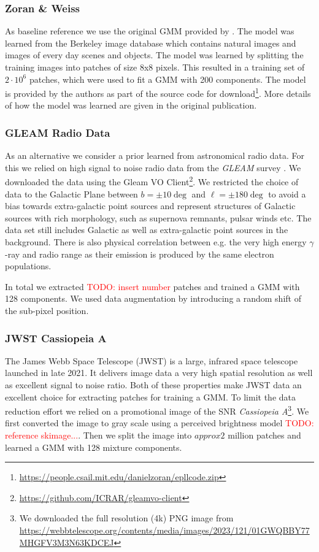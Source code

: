 \documentclass[twocolumn]{aastex631}
\newcommand{\gammaray}{$\gamma$-ray\xspace}
\newcommand{\todo}[1]{\textcolor{red}{TODO: #1}\PackageWarning{TODO:}{#1!}}
\begin{document}
    \subsubsection{Zoran \& Weiss}
    As baseline reference we use the original GMM provided by \cite{Zoran2011}. The model was learned from the Berkeley image database \citep{Martin2001} which contains natural images and images of every day scenes and objects. The model was learned by splitting the training images into patches of size 8x8 pixels. This resulted in a training set of $2 \cdot 10^{6}$ patches, which were used to fit a GMM with 200 components. The model is provided by the authors as part of the source code for download\footnote{\url{https://people.csail.mit.edu/danielzoran/epllcode.zip}}. More details of how the model was learned are given in the original publication.
    
    \subsubsection{GLEAM Radio Data}
    \label{sssec:gleam-radio-data}
    As an alternative we consider a prior learned from astronomical radio data. For this we relied on high signal to noise radio data from the \textit{GLEAM} survey \cite{HurleyWalker2022}. We downloaded the data using the Gleam VO Client\footnote{\url{https://github.com/ICRAR/gleamvo-client}}. We restricted the choice of data to the Galactic Plane between $b=\pm10\deg$ and $\ell = \pm180\deg$ to avoid a bias towards extra-galactic point sources and represent structures of Galactic sources with rich morphology, such as supernova remnants, pulsar winds etc. The data set still includes Galactic as well as extra-galactic point sources in the background. There is also physical correlation between e.g. the very high energy \gammaray and radio range as their emission is produced by the same electron populations.

    In total we extracted \todo{insert number} patches and trained a GMM with 128 components. We used data augmentation by introducing a random shift of the sub-pixel position.

    \subsubsection{JWST Cassiopeia A}
    The James Webb Space Telescope (JWST) is a large, infrared space telescope launched in late 2021. It delivers image data a very high spatial resolution as well as excellent signal to noise ratio. Both of these properties make JWST data an excellent choice for extracting patches for training a GMM. To limit the data reduction effort we relied on a promotional image of the SNR \textit{Cassiopeia A}\footnote{We downloaded the full resolution (4k)  PNG image from \url{https://webbtelescope.org/contents/media/images/2023/121/01GWQBBY77MHGFV3M3N63KDCEJ}}.
    We first converted the image to gray scale using a perceived brightness model \todo{reference skimage...}. Then we split the image into $approx 2$ million patches and learned a GMM with 128 mixture components.
    
\end{document}
